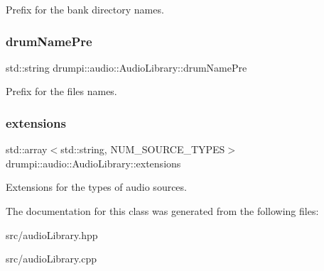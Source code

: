 Prefix for the bank directory names. \mbox{\label{classdrumpi_1_1audio_1_1AudioLibrary_a5ca1e85586737e053ff1278868b94878}} 
\subsubsection{\texorpdfstring{drum\+Name\+Pre}{drumNamePre}}
{\footnotesize\ttfamily std\+::string drumpi\+::audio\+::\+Audio\+Library\+::drum\+Name\+Pre\hspace{0.3cm}{\ttfamily [private]}}

Prefix for the files\textquotesingle{} names. \mbox{\label{classdrumpi_1_1audio_1_1AudioLibrary_a064522c821b6ec210166aa44c3003777}} 
\subsubsection{\texorpdfstring{extensions}{extensions}}
{\footnotesize\ttfamily std\+::array$<$std\+::string, N\+U\+M\+\_\+\+S\+O\+U\+R\+C\+E\+\_\+\+T\+Y\+P\+ES$>$ drumpi\+::audio\+::\+Audio\+Library\+::extensions\hspace{0.3cm}{\ttfamily [private]}}

Extensions for the types of audio sources. 

The documentation for this class was generated from the following files\+:\begin{DoxyCompactItemize}
\item 
src/audio\+Library.\+hpp\item 
src/audio\+Library.\+cpp\end{DoxyCompactItemize}
